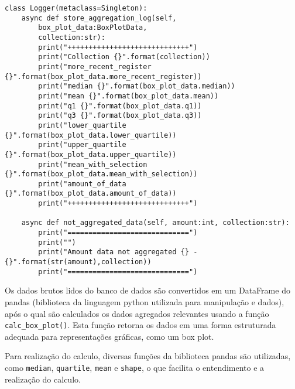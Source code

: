 \begin{verbatim}
class Logger(metaclass=Singleton):
    async def store_aggregation_log(self,
        box_plot_data:BoxPlotData,
        collection:str):
        print("+++++++++++++++++++++++++++++")
        print("Collection {}".format(collection))
        print("more_recent_register {}".format(box_plot_data.more_recent_register))
        print("median {}".format(box_plot_data.median))
        print("mean {}".format(box_plot_data.mean))
        print("q1 {}".format(box_plot_data.q1))
        print("q3 {}".format(box_plot_data.q3))
        print("lower_quartile {}".format(box_plot_data.lower_quartile))
        print("upper_quartile {}".format(box_plot_data.upper_quartile))
        print("mean_with_selection {}".format(box_plot_data.mean_with_selection))
        print("amount_of_data {}".format(box_plot_data.amount_of_data))
        print("+++++++++++++++++++++++++++++")

    async def not_aggregated_data(self, amount:int, collection:str):
        print("=============================")
        print("")
        print("Amount data not aggregated {} - {}".format(str(amount),collection))
        print("=============================")
\end{verbatim}

Os dados brutos lidos do banco de dados são convertidos em um DataFrame do pandas (biblioteca da linguagem python utilizada para manipulação e dados), após o qual são calculados os dados agregados relevantes usando a função \texttt{calc\_box\_plot()}. Esta função retorna os dados em uma forma estruturada adequada para representações gráficas, como um box plot.

Para realização do calculo, diversas funções da biblioteca pandas são utilizadas, como \texttt{median}, \texttt{quartile}, \texttt{mean} e \texttt{shape}, o que facilita o entendimento e a realização do calculo. 

